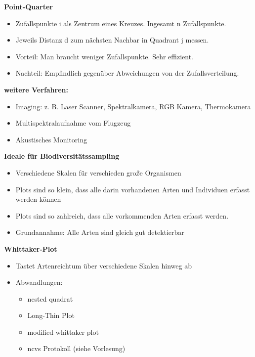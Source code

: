 \textbf{Point-Quarter}
\begin{itemize}
	\item Zufallspunkte i als Zentrum eines Kreuzes. Ingesamt n Zufallspunkte.
	\item Jeweils Distanz d zum nächsten Nachbar in Quadrant j messen.
	\item Vorteil: Man braucht weniger Zufallspunkte. Sehr effizient.
	\item Nachteil: Empfindlich gegenüber Abweichungen von der Zufallsverteilung.
\end{itemize}

\textbf{weitere Verfahren:}
\begin{itemize}
	\item Imaging: z. B. Laser Scanner, Spektralkamera, RGB Kamera, Thermokamera
	\item Multispektralaufnahme vom Flugzeug
	\item Akustisches Monitoring
\end{itemize}

\textbf{Ideale für Biodiversitätssampling}
\begin{itemize}
	\item Verschiedene Skalen für verschieden große Organismen
	\item Plots sind so klein, dass alle darin vorhandenen Arten und Individuen erfasst werden können
	\item Plots sind so zahlreich, dass alle vorkommenden Arten erfasst werden.
	\item Grundannahme: Alle Arten sind gleich gut detektierbar
\end{itemize}

\textbf{Whittaker-Plot}
\begin{itemize}
	\item Tastet Artenreichtum über verschiedene Skalen hinweg ab
	\item Abwandlungen:
	\begin{itemize}
		\item nested quadrat
		\item Long-Thin Plot
		\item modified whittaker plot
		\item ncvs Protokoll (siehe Vorlesung)
	\end{itemize}
\end{itemize}

